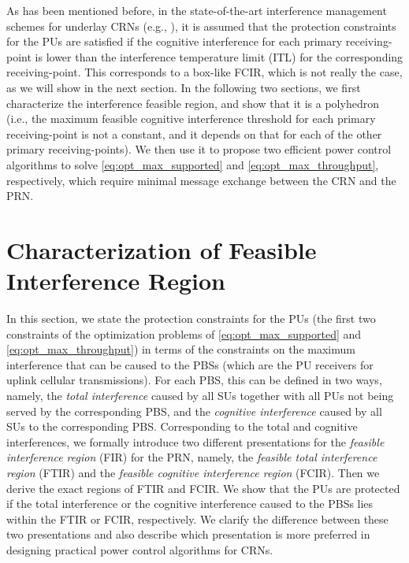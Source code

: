 \documentclass[journal,twoside]{IEEEtran}
\begin{document}
	As has been mentioned before, in the state-of-the-art interference management schemes for underlay CRNs 
(e.g.,  \cite{JPAC_adhoc_convex_relaxation_single_PU, distributed_JPAC_antenna_arrays, 7, JPAC_SSA1,ISMIRA, LGRA,monemi_ESRPA,throughput_in_mesh_networks,bad_ITL6_IET_throughput,GP_bad_ITL,badITL4,throughput_coupled_interference_game_bad_ITL,Robust_Max_Throughput_Wang_2015,throughput_distributed_game_bad_ITL,Beamforming_Cognitive_2015,Max_Throughput_Femto_Zhang_2015 }), it is assumed that the  protection constraints for the PUs are satisfied if the cognitive interference for each primary receiving-point is lower than  the interference temperature limit (ITL) for the corresponding receiving-point.  This corresponds to a box-like FCIR, which is not really the case, as we will show in the next section.		 
	In the following two sections, we first characterize the interference feasible region, and show that it is a polyhedron (i.e.,  the maximum feasible cognitive interference threshold for each primary receiving-point is not a constant, and it depends on that for each of the other primary receiving-points). We then use it to propose two efficient power control algorithms to solve \eqref{eq:opt_max_supported} and \eqref{eq:opt_max_throughput}, respectively, which require minimal message exchange between the CRN and  the PRN.
	
\section{Characterization of Feasible Interference Region}
	\label{sec:charecterizing_FIR}
	In this section, we state the protection constraints for the PUs (the first two constraints of the optimization problems of \eqref{eq:opt_max_supported} and \eqref{eq:opt_max_throughput}) in terms of the constraints on the maximum interference that can be caused to the PBSs (which are the PU receivers for uplink cellular transmissions). For each PBS, this can be defined in two ways, namely, the \emph{total interference} caused by all SUs together with all PUs not being served by the corresponding PBS, and the \emph{cognitive interference} caused by all SUs to the corresponding PBS. Corresponding to the total and cognitive interferences, we formally introduce two different presentations for the \emph{feasible interference region} (FIR) for the PRN, namely, the \emph{feasible total interference region} (FTIR) and the \emph{feasible cognitive interference region} (FCIR). Then we derive the exact regions of FTIR and FCIR. We show that the PUs are protected if the total interference or the cognitive interference caused to the PBSs lies within the FTIR or FCIR, respectively. We  clarify the difference between these two presentations  and also describe which presentation is more preferred in designing practical power control algorithms for CRNs. 
\end{document}
